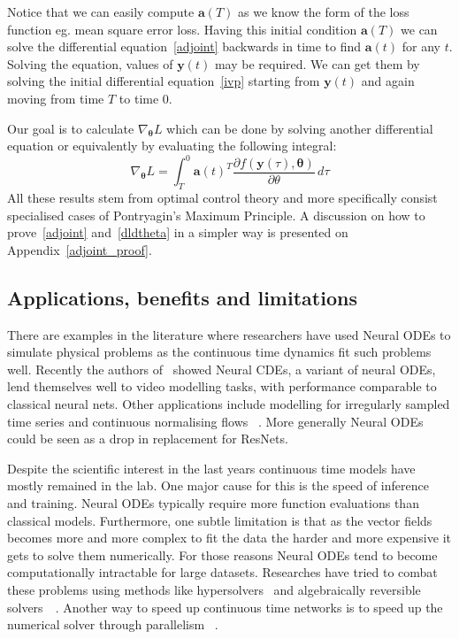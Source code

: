 \documentclass[11pt]{report}
\begin{document}
    Notice that we can easily compute $\pmb{a}(T)$ as we know the form of the loss function eg.
    mean square error loss.
    Having this initial condition $\pmb{a}(T)$ we can solve the differential equation~\eqref{adjoint} backwards in time to find $\pmb{a}(t)$ for any $t$.
    Solving the equation, values of $\pmb{y}(t)$ may be required.
    We can get them by solving the initial differential equation~\eqref{ivp} starting from $\pmb{y}(t)$ and again moving from time $T$ to time $0$.

    Our goal is to calculate $\nabla_{\pmb{\theta}}L$ which can be done by solving another differential equation or equivalently by evaluating the following integral:
    \begin{equation}
        \nabla_{\pmb{\theta}}L
        = \int_T^0
        \pmb{a}(t)^T
        \frac
        {\partial f(\pmb{y}(\tau), \pmb{\theta})}
        {\partial \theta}
        \, d\tau
        \label{dldtheta}
    \end{equation}
    All these results stem from optimal control theory and more specifically consist specialised cases of Pontryagin's Maximum Principle.
    A discussion on how to prove~\eqref{adjoint} and~\eqref{dldtheta} in a simpler way is presented on Appendix~\ref{adjoint_proof}.

    \subsection{Applications, benefits and limitations}
    There are examples in the literature where researchers have used Neural ODEs to simulate physical problems as the continuous time dynamics fit such problems well.
    Recently the authors of~\cite{chiu2023exploiting} showed Neural CDEs, a variant of neural ODEs, lend themselves well to video modelling tasks, with performance comparable to classical neural nets.
    Other applications include modelling for irregularly sampled time series and continuous normalising flows ~\cite{chen2018neural,kidger2022neural}.
    More generally Neural ODEs could be seen as a drop in replacement for ResNets.

    Despite the scientific interest in the last years continuous time models have mostly remained in the lab.
    One major cause for this is the speed of inference and training.
    Neural ODEs typically require more function evaluations than classical models.
    Furthermore, one subtle limitation is that as the vector fields becomes more and more complex to fit the data the harder and more expensive it gets to solve them numerically.
    For those reasons Neural ODEs tend to become computationally intractable for large datasets.
    Researches have tried to combat these problems using methods like hypersolvers~\cite{poli2020hypersolvers} and algebraically
    reversible solvers~\cite{kidger2021efficient,zhuang2021mali}~.
    Another way to speed up continuous time networks is to speed up the numerical solver through parallelism ~\cite{gander201550}.
\end{document}
